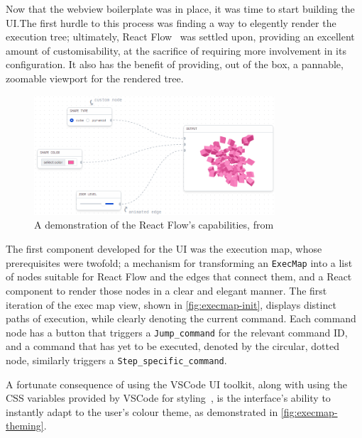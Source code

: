Now that the webview boilerplate was in place, it was time to start building the
UI.\@ The first hurdle to this process was finding a way to elegently render
the execution tree; ultimately, React Flow~\cite{react-flow} was settled upon,
providing an excellent amount of customisability, at the sacrifice of requiring
more involvement in its configuration. It also has the benefit of providing,
out of the box, a pannable, zoomable viewport for the rendered tree.

\begin{figure}
  \center{}
  \includegraphics[width=0.8\textwidth]{img/react-flow-demo.png}
  \caption{
    A demonstration of the React Flow's capabilities,
    from~\cite{react-flow}}%
  \label{fig:react-flow}
\end{figure}

The first component developed for the UI was the execution map, whose
prerequisites were twofold; a mechanism for transforming an \texttt{ExecMap}
into a list of nodes suitable for React Flow and the edges that connect them,
and a React component to render those nodes in a clear and elegant manner. The
first iteration of the exec map view, shown in \autoref{fig:execmap-init},
displays distinct paths of execution, while clearly denoting the current
command. Each command node has a button that triggers a \texttt{Jump\_command}
for the relevant command ID, and a command that has yet to be executed, denoted
by the circular, dotted node, similarly triggers a
\texttt{Step\_specific\_command}.

A fortunate consequence of using the VSCode UI toolkit, along with using the CSS
variables provided by VSCode for styling~\cite{vscode-theme}, is the interface's
ability to instantly adapt to the user's colour theme, as demonstrated in
\autoref{fig:execmap-theming}.


